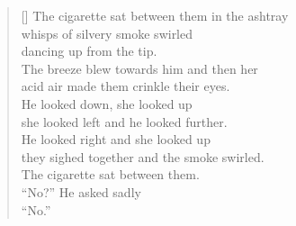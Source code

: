 \documentclass[12pt,oneside,openany]{memoir}
\newcommand{\attrib}[1]{%
\nopagebreak{\raggedleft\footnotesize #1\par}}
\begin{document}
\author{Noah Eisen}
\thispagestyle{empty}

\bigskip
\settowidth{\versewidth}{The cigarette sat between them in the ashtray}
\begin{verse}[\versewidth]
The cigarette sat between them in the ashtray\\
whisps of silvery smoke swirled\\
dancing up from the tip. \\
\bigskip
The breeze blew towards him and then her\\
acid air made them crinkle their eyes.\\
\bigskip
He looked down, she looked up\\
she looked left and he looked further.\\
\bigskip
He looked right and she looked up\\
they sighed together and the smoke swirled.\\
\bigskip
The cigarette sat between them.\\
“No?” He asked sadly\\
“No.”
\end{verse}
\attrib{Noah Eisen}
\end{document}
